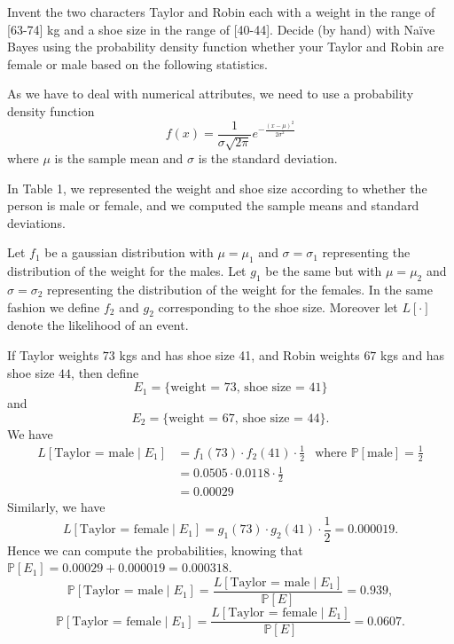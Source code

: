 \documentclass[fontsize=12pt, usenames, dvipsnames, headinclude, headsepline, footinclude, footsepline]{scrartcl}
\title{\normalfont{\bfseries{Machine Learning: Homework 3}}}
\author{Laurent \textsc{Hayez}}
\date{\today}
\renewcommand{\P}{\mathbb{P}}
\begin{document}
\renewcommand{\labelitemi}{\textbullet}



\maketitle




\begin{exo}
  Invent the two characters Taylor and Robin each with a weight in the range of [63-74] kg and a shoe size in
  the range of [40-44]. Decide (by hand) with Naïve Bayes using the probability density function whether your
  Taylor and Robin are female or male based on the following statistics.
\end{exo}

  \begin{sol}
    As we have to deal with numerical attributes, we need to use a probability density function 
    \[ f(x) = \frac{1}{\sigma \sqrt{2 \pi}} e^{-\frac{(x - \mu)^2}{2\sigma^2}} \]
    where $\mu$ is the sample mean and $\sigma$ is the standard deviation.

    In Table 1, we represented the weight and shoe size according to whether the person is male or female, and
    we computed the sample means and standard deviations. 

    Let $f_1$ be a gaussian distribution with $\mu = \mu_1$ and $\sigma = \sigma_1$ representing the
    distribution of the weight for the males. Let $g_1$ be the same but with $\mu = \mu_2$ and $\sigma =
    \sigma_2$ representing the distribution of the weight for the females. In the same fashion we define $f_2$
    and $g_2$ corresponding to the shoe size. Moreover let $L[\cdot]$ denote the likelihood of an event.

    If Taylor weights $73$ kgs and has shoe size 41, and Robin weights $67$ kgs and has shoe size $44$, then
    define \[E_1 = \{\text{weight = 73, shoe size = 41}\}\] and \[E_2 = \{\text{weight = 67, shoe size =
      44}\}.\] 
    We have
    \begin{align*}
      L[\text{Taylor = male} \mid E_1] &= f_1(73) \cdot f_2(41) \cdot \frac{1}{2} & \text{where }
                                                                                    \P[\text{male}] =
                                                                                    \frac{1}{2}\\
                                       &= 0.0505 \cdot 0.0118 \cdot \frac{1}{2}\\
      &= 0.00029
    \end{align*}
    Similarly, we have 
    \[ L[\text{Taylor = female} \mid E_1] = g_1(73) \cdot g_2(41) \cdot \frac{1}{2} = 0.000019.\]
    Hence we can compute the probabilities, knowing that $\P[E_1] = 0.00029 + 0.000019 = 0.000318$.
    \[ \P[\text{Taylor = male} \mid E_1] = \frac{L[\text{Taylor = male} \mid E_1]}{\P[E]} = 0.939, \]
    \[ \P[\text{Taylor = female} \mid E_1] = \frac{L[\text{Taylor = female} \mid E_1]}{\P[E]} = 0.0607. \]
    

\end{sol}
\end{document}
